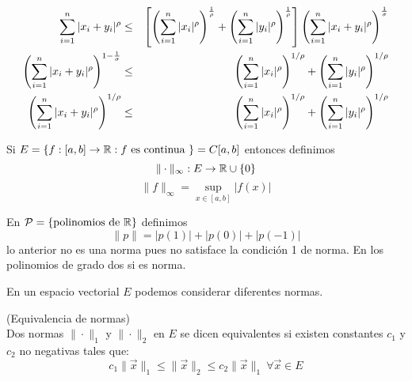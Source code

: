\begin{demostracion}
\begin{eqnarray*}
\sum_{i=1}^n |x_i + y_i|^\rho &\leq& \left[\left(\sum_{i=1}^n |x_i|^\rho \right)^{\frac{1}{\rho}} + \left(\sum_{i=1}^n |y_i|^\rho \right)^{\frac{1}{\rho}} \right] \left(\sum_{i=1}^n |x_i+y_i|^{\rho} \right)^{\frac{1}{\sigma}} \cr
\left(\sum_{i=1}^n |x_i + y_i|^\rho \right)^{1-\frac{1}{\sigma}} &\leq& \left(\sum_{i=1}^n |x_i|^\rho \right)^{1/\rho} + \left(\sum_{i=1}^n |y_i|^\rho \right)^{1/\rho} \cr
\left(\sum_{i=1}^n |x_i + y_i|^\rho \right)^{1/\rho} &\leq& \left(\sum_{i=1}^n |x_i|^\rho \right)^{1/\rho} + \left(\sum_{i=1}^n |y_i|^\rho \right)^{1/\rho}
\end{eqnarray*}
\end{demostracion}

\begin{ejemplo}
Si $E=\{f:[a,b]\to\mathbb{R} : f \text{ es continua }\}=C[a,b]$ entonces definimos
\[\|\cdot\|_\infty :E\to\mathbb{R}\cup\{0\}\]
\[\|f\|_\infty=\sup_{x\in [a,b]}{|f(x)|}\]
\end{ejemplo}
\begin{ejemplo}
En ${\cal{P}}=\{\text{polinomios de }\mathbb{R}\}$ definimos
$$\|p\|=|p(1)|+|p(0)|+|p(-1)|$$ 
lo anterior no es una norma pues no satisface la condici\'on 1 de norma. En los polinomios de grado dos si es norma.
\end{ejemplo}

En un espacio vectorial $E$ podemos considerar
diferentes normas.

\begin{teorema}{\rm (Equivalencia de normas)}\label{equivalencia-de-normas}
\\Dos normas $\|\cdot\|_1$ y $\|\cdot\|_2$ en $E$ se dicen equivalentes si existen constantes $c_1$ y $c_2$ no negativas tales que:
$$ c_1 \|\vec{x}\|_1 \leq \|\vec{x}\|_2 \leq c_2 \|\vec{x}\|_1 \: \forall \vec{x} \in E$$
\end{teorema}

